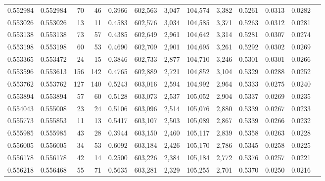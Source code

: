 \begin{tabular}{rrrrrrrrrrrrr}
0.552984 & 0.552984 &    70 &    46 &                                     0.3966 & 602,563 &   3,047 & 104,574 &   3,382 & 0.5261 & 0.0313 & 0.0282 \\
0.553026 & 0.553026 &    13 &    11 &                                     0.4583 & 602,576 &   3,034 & 104,585 &   3,371 & 0.5263 & 0.0312 & 0.0281 \\
0.553138 & 0.553138 &    73 &    57 &                                     0.4385 & 602,649 &   2,961 & 104,642 &   3,314 & 0.5281 & 0.0307 & 0.0274 \\
0.553198 & 0.553198 &    60 &    53 &                                     0.4690 & 602,709 &   2,901 & 104,695 &   3,261 & 0.5292 & 0.0302 & 0.0269 \\
0.553365 & 0.553472 &    24 &    15 &                                     0.3846 & 602,733 &   2,877 & 104,710 &   3,246 & 0.5301 & 0.0301 & 0.0266 \\
0.553596 & 0.553613 &   156 &   142 &                                     0.4765 & 602,889 &   2,721 & 104,852 &   3,104 & 0.5329 & 0.0288 & 0.0252 \\
0.553762 & 0.553762 &   127 &   140 &                                     0.5243 & 603,016 &   2,594 & 104,992 &   2,964 & 0.5333 & 0.0275 & 0.0240 \\
0.553894 & 0.553894 &    57 &    60 &                                     0.5128 & 603,073 &   2,537 & 105,052 &   2,904 & 0.5337 & 0.0269 & 0.0235 \\
0.554043 & 0.555008 &    23 &    24 &                                     0.5106 & 603,096 &   2,514 & 105,076 &   2,880 & 0.5339 & 0.0267 & 0.0233 \\
0.555773 & 0.555853 &    11 &    13 &                                     0.5417 & 603,107 &   2,503 & 105,089 &   2,867 & 0.5339 & 0.0266 & 0.0232 \\
0.555985 & 0.555985 &    43 &    28 &                                     0.3944 & 603,150 &   2,460 & 105,117 &   2,839 & 0.5358 & 0.0263 & 0.0228 \\
0.556005 & 0.556005 &    34 &    53 &                                     0.6092 & 603,184 &   2,426 & 105,170 &   2,786 & 0.5345 & 0.0258 & 0.0225 \\
0.556178 & 0.556178 &    42 &    14 &                                     0.2500 & 603,226 &   2,384 & 105,184 &   2,772 & 0.5376 & 0.0257 & 0.0221 \\
0.556218 & 0.556468 &    55 &    71 &                                     0.5635 & 603,281 &   2,329 & 105,255 &   2,701 & 0.5370 & 0.0250 & 0.0216 \\

\end{tabular}
